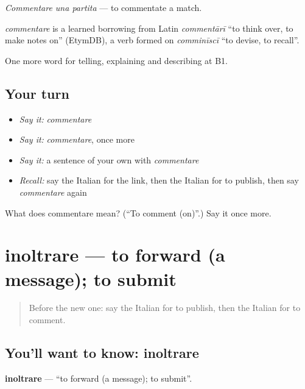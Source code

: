 \emph{Commentare una partita} — to commentate a match.

\begin{cousinweb}
\emph{commentare} is a learned borrowing from Latin \emph{commentārī} \textquotedblleft{}to think over, to make notes on\textquotedblright{} (EtymDB), a verb formed on \emph{comminīscī} \textquotedblleft{}to devise, to recall\textquotedblright{}.
\end{cousinweb}

\begin{grammarlens}[title={What you've built}]
One more word for telling, explaining and describing at B1.
\end{grammarlens}

\subsection*{Your turn}
\begin{itemize}
\raggedright
  \item \emph{Say it:} \emph{commentare}
  \item \emph{Say it:} \emph{commentare}, once more
  \item \emph{Say it:} a sentence of your own with \emph{commentare}
  \item \emph{Recall:} say the Italian for the link, then the Italian for to publish, then say \emph{commentare} again
\end{itemize}

\begin{tcolorbox}[breakable,colback=teal!4,colframe=teal!35!black,title={Before you move on}]
What does commentare mean? (\textquotedblleft{}To comment (on)\textquotedblright{}.) Say it once more.
\end{tcolorbox}
\section[inoltrare]{inoltrare — to forward (a message); to submit}

\label{lesson:IT-C403-inoltrare}



\begin{quote}
Before the new one: say the Italian for to publish, then the Italian for to comment.
\end{quote}

\subsection*{You'll want to know: inoltrare}
\textbf{inoltrare} — \textquotedblleft{}to forward (a message); to submit\textquotedblright{}.

